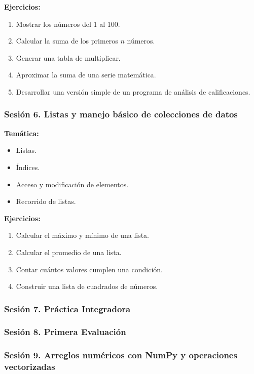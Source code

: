 \documentclass[12pt,letterpaper]{article}
\begin{document}
\textbf{Ejercicios:}
\begin{enumerate}[noitemsep]
    \item Mostrar los números del 1 al 100.
    \item Calcular la suma de los primeros $n$ números.
    \item Generar una tabla de multiplicar.
    \item Aproximar la suma de una serie matemática.
    \item Desarrollar una versión simple de un programa de análisis de calificaciones.
\end{enumerate}

\subsubsection*{Sesión 6. Listas y manejo básico de colecciones de datos}

\textbf{Temática:}
\begin{itemize}[noitemsep]
    \item Listas.
    \item Índices.
    \item Acceso y modificación de elementos.
    \item Recorrido de listas.
\end{itemize}

\textbf{Ejercicios:}
\begin{enumerate}[noitemsep]
    \item Calcular el máximo y mínimo de una lista.
    \item Calcular el promedio de una lista.
    \item Contar cuántos valores cumplen una condición.
    \item Construir una lista de cuadrados de números.
\end{enumerate}

\subsubsection*{Sesión 7. Práctica Integradora}
\subsubsection*{Sesión 8. Primera Evaluación}
\subsubsection*{Sesión 9. Arreglos numéricos con NumPy y operaciones vectorizadas}
\end{document}
